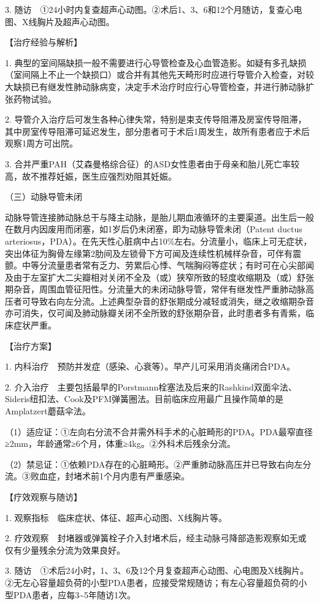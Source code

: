 3.
随访　①24小时内复查超声心动图。②术后1、3、6和12个月随访，复查心电图、X线胸片及超声心动图。

【治疗经验与解析】

1.
典型的室间隔缺损一般不需要进行心导管检查及心血管造影。如疑有多孔缺损（室间隔上不止一个缺损口）或合并有其他先天畸形时应进行导管介入检查，对较大缺损已有继发性肺动脉病变，决定手术治疗时应行心导管检查，并进行肺动脉扩张药物试验。

2.
导管介入治疗后可发生各种心律失常，特别是束支传导阻滞及房室传导阻滞，其中房室传导阻滞可延迟发生，部分患者可于术后1周发生，故所有患者应于术后观察1周方可出院。

3.
合并严重PAH（艾森曼格综合征）的ASD女性患者由于母亲和胎儿死亡率较高，故不推荐妊娠，医生应强烈劝阻其妊娠。

{（三）动脉导管未闭}

动脉导管连接肺动脉总干与降主动脉，是胎儿期血液循环的主要渠道。出生后一般在数月内因废用而闭塞，如1岁后仍未闭塞，即为动脉导管未闭（Patent
ductus
arteriosus，PDA）。在先天性心脏病中占10\%左右。分流量小，临床上可无症状，突出体征为胸骨左缘第2肋间及左锁骨下方可闻及连续性机械样杂音，可伴有震颤。中等分流量患者常有乏力、劳累后心悸、气喘胸闷等症状；有时可在心尖部闻及由于左室扩大二尖瓣相对关闭不全及（或）狭窄所致的轻度收缩期及（或）舒张期杂音，周围血管征阳性。分流量大的未闭动脉导管，常伴有继发性严重肺动脉高压者可导致右向左分流。上述典型杂音的舒张期成分减轻或消失，继之收缩期杂音亦可消失，仅可闻及肺动脉瓣关闭不全所致的舒张期杂音，此时患者多有青紫，临床症状严重。

【治疗方案】

1. 内科治疗　预防并发症（感染、心衰等）。早产儿可采用消炎痛闭合PDA。

2.
介入治疗　主要包括最早的Porstmann栓塞法及后来的Rashkind双面伞法、Sideris纽扣法、Cook及PFM弹簧圈法。目前临床应用最广且操作简单的是Amplatzert蘑菇伞法。

（1）适应证：①左向右分流不合并需外科手术的心脏畸形的PDA。PDA最窄直径≥2mm，年龄通常≥6个月，体重≥4kg。②外科术后残余分流。

（2）禁忌证：①依赖PDA存在的心脏畸形。②严重肺动脉高压并已导致右向左分流。③败血症，封堵术前1个月内患有严重感染。

【疗效观察与随访】

1. 观察指标　临床症状、体征、超声心动图、X线胸片等。

2.
疗效观察　封堵器或弹簧栓子介入封堵术后，经主动脉弓降部造影观察如无或仅有少量残余分流为效果良好。

3.
随访　①术后24小时，1、3、6及12个月复查超声心动图、心电图及X线胸片。②无左心容量超负荷的小型PDA患者，应接受常规随访；有左心容量超负荷的小型PDA患者，应每3\textasciitilde{}5年随访1次。

